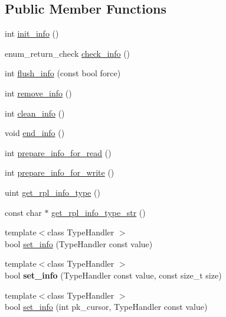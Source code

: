 \subsection*{Public Member Functions}
\begin{DoxyCompactItemize}
\item 
int \mbox{\hyperlink{classRpl__info__handler_a92559efdec03943928c9d5960772eda4}{init\+\_\+info}} ()
\item 
enum\+\_\+return\+\_\+check \mbox{\hyperlink{classRpl__info__handler_a0afe20cc43d797feca8e6bc107502b9b}{check\+\_\+info}} ()
\item 
int \mbox{\hyperlink{classRpl__info__handler_a9a1543acf68477c3b89620d422fbd7f7}{flush\+\_\+info}} (const bool force)
\item 
int \mbox{\hyperlink{classRpl__info__handler_aa734fb150f1127b83d2f91fbc00a43d2}{remove\+\_\+info}} ()
\item 
int \mbox{\hyperlink{classRpl__info__handler_a236565d50a2526ad5c80ee9c35962426}{clean\+\_\+info}} ()
\item 
void \mbox{\hyperlink{classRpl__info__handler_aa75796cbc500ede06ef1c5108140fc4c}{end\+\_\+info}} ()
\item 
int \mbox{\hyperlink{classRpl__info__handler_a844b3bc4a46e6f9c436cd94d4ed9173a}{prepare\+\_\+info\+\_\+for\+\_\+read}} ()
\item 
int \mbox{\hyperlink{classRpl__info__handler_acd0304690a9d5f21c797915173ee32ab}{prepare\+\_\+info\+\_\+for\+\_\+write}} ()
\item 
uint \mbox{\hyperlink{classRpl__info__handler_a03b60b31e7c1e1bf2ee38f128e8d7b73}{get\+\_\+rpl\+\_\+info\+\_\+type}} ()
\item 
const char $\ast$ \mbox{\hyperlink{classRpl__info__handler_a87bbb35084597a3b27409ec588a30fc5}{get\+\_\+rpl\+\_\+info\+\_\+type\+\_\+str}} ()
\item 
{\footnotesize template$<$class Type\+Handler $>$ }\\bool \mbox{\hyperlink{classRpl__info__handler_a8068f40bbccae426a48bb055b7c7f776}{set\+\_\+info}} (Type\+Handler const value)
\item 
\mbox{\label{classRpl__info__handler_ad2cfcb411abfd66248cd4cb6a21df3f6}} 
{\footnotesize template$<$class Type\+Handler $>$ }\\bool {\bfseries set\+\_\+info} (Type\+Handler const value, const size\+\_\+t size)
\item 
{\footnotesize template$<$class Type\+Handler $>$ }\\bool \mbox{\hyperlink{classRpl__info__handler_af0b9aa18c1930518525ddee16f0e6316}{set\+\_\+info}} (int pk\+\_\+cursor, Type\+Handler const value)

\end{DoxyCompactItemize}
